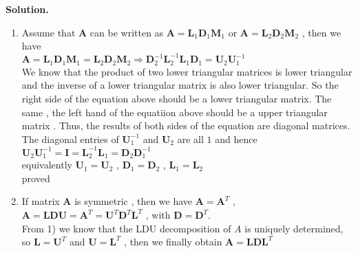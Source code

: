 \documentclass[english,onecolumn]{IEEEtran}
\begin{document}
\noindent\textbf{Solution.}
\begin{enumerate}
    \item Assume that $\mathbf{A}$ can be written as $\mathbf{A}=\mathbf{L}_{1}\mathbf{D}_{1}\mathbf{M}_{1}$ or $\mathbf{A}=\mathbf{L}_{2}\mathbf{D}_{2}\mathbf{M}_{2}$ , then we have 
    \\
    $\mathbf{A}=\mathbf{L}_{1}\mathbf{D}_{1}\mathbf{M}_{1}=\mathbf{L}_{2}\mathbf{D}_{2}\mathbf{M}_{2} \Rightarrow \mathbf{D}_{2}^{-1}\mathbf{L}_{2}^{-1}\mathbf{L}_{1}\mathbf{D}_{1}=\mathbf{U}_{2}\mathbf{U}_{1}^{-1}$\\
    We know that the product of two lower triangular matrices is lower triangular and the inverse of a lower triangular matrix is also lower triangular. So the right side of the equation above should be a lower triangular matrix. The same , the left hand of the equatiion above should be a upper triangular matrix . Thus, the results of both sides of the equation are diagonal matrices. The diagonal entries of $\mathbf{U}_{1}^{-1}$ and $\mathbf{U}_{2}$ are all $1$ and hence
    \\
    $\mathbf{U}_{2}\mathbf{U}_{1}^{-1}=\mathbf{I}=\mathbf{L}_{2}^{-1}\mathbf{L}_{1}=\mathbf{D}_{2}\mathbf{D}_{1}^{-1}$\\
    equivalently
    $\mathbf{U}_{1}=\mathbf{U}_{2}$ , $\mathbf{D}_{1}=\mathbf{D}_{2}$ , $\mathbf{L}_{1}=\mathbf{L}_{2}$\\
    proved
     
    \item 
    If matrix $\mathbf{A}$ is symmetric , then we have $\mathbf{A}=\mathbf{A}^{T}$ , $\mathbf{A}=\mathbf{L}\mathbf{D}\mathbf{U}=\mathbf{A}^{T}=\mathbf{U}^{T}\mathbf{D}^{T}\mathbf{L}^{T}$ , with $\mathbf{D}=\mathbf{D}^{T}$.\\
    From 1) we know that the LDU decomposition of $A$ is uniquely determined, so $\mathbf{L}=\mathbf{U}^{T}$ and $\mathbf{U}=\mathbf{L}^{T}$ , then we finally obtain $\mathbf{A}=\mathbf{L}\mathbf{D}\mathbf{L}^{T}$
     

\end{enumerate}
\end{document}
